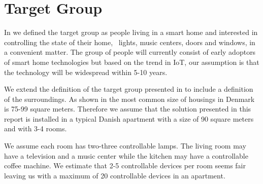 \section{Target Group}
\label{sec:target-group}

In \cite[p. 15]{prespecialisation} we defined the target group as people living in a smart home and interested in controlling the state of their home, \eg~lights, music centers, doors and windows, in a convenient matter. The group of people will currently consist of early adoptors of smart home technologies but based on the trend in IoT, our assumption is that the technology will be widespread within 5-10 years. 

We extend the definition of the target group presented in \cite[p. 15]{prespecialisation} to include a definition of the surroundings. As shown in  the most common size of housings in Denmark is 75-99 square meters. Therefore we assume that the solution presented in this report is installed in a typical Danish apartment with a size of 90 square meters and with 3-4 rooms. 

We assume each room has two-three controllable lamps. The living room may have a television and a music center while the kitchen may have a controllable coffee machine. We estimate that 2-5 controllable devices per room seems fair leaving us with a maximum of 20 controllable devices in an apartment.

